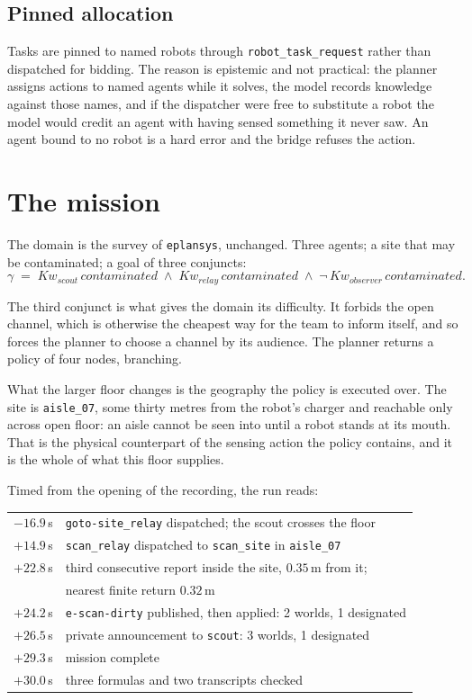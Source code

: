 \documentclass[11pt,a4paper]{article}
\theoremstyle{definition}
\newcommand{\Kw}[1]{\mathit{Kw}_{#1}}
\newcommand{\code}[1]{\texttt{\small #1}}
\begin{document}
\subsection{Pinned allocation}

Tasks are pinned to named robots through \code{robot\_task\_request} rather
than dispatched for bidding. The reason is epistemic and not practical: the
planner assigns actions to named agents while it solves, the model records
knowledge against those names, and if the dispatcher were free to substitute a
robot the model would credit an agent with having sensed something it never
saw. An agent bound to no robot is a hard error and the bridge refuses the
action.

\section{The mission}
\label{sec:run}

The domain is the survey of \code{eplansys}, unchanged. Three agents; a site
that may be contaminated; a goal of three conjuncts:
\[
\gamma \;=\; \Kw{\mathit{scout}}\,\mathit{contaminated}
\;\wedge\; \Kw{\mathit{relay}}\,\mathit{contaminated}
\;\wedge\; \neg\,\Kw{\mathit{observer}}\,\mathit{contaminated}.
\]

The third conjunct is what gives the domain its difficulty. It forbids the open
channel, which is otherwise the cheapest way for the team to inform itself, and
so forces the planner to choose a channel by its audience. The planner returns
a policy of four nodes, branching.

What the larger floor changes is the geography the policy is executed over. The
site is \code{aisle\_07}, some thirty metres from the robot's charger and
reachable only across open floor: an aisle cannot be seen into until a robot
stands at its mouth. That is the physical counterpart of the sensing action the
policy contains, and it is the whole of what this floor supplies.

Timed from the opening of the recording, the run reads:

\begin{center}\small
\begin{tabular}{@{}rl@{}}
\toprule
$-16.9$\,s & \code{goto-site\_relay} dispatched; the scout crosses the floor \\
$+14.9$\,s & \code{scan\_relay} dispatched to \code{scan\_site} in \code{aisle\_07} \\
$+22.8$\,s & third consecutive report inside the site, $0.35$\,m from it; \\
           & nearest finite return $0.32$\,m \\
$+24.2$\,s & \code{e-scan-dirty} published, then applied: 2 worlds, 1 designated \\
$+26.5$\,s & private announcement to \code{scout}: 3 worlds, 1 designated \\
$+29.3$\,s & mission complete \\
$+30.0$\,s & three formulas and two transcripts checked \\
\bottomrule
\end{tabular}
\end{center}
\end{document}
